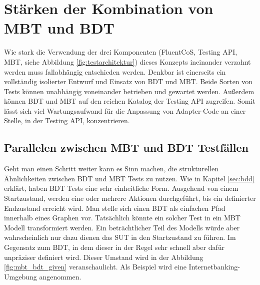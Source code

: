 \section{Stärken der Kombination von MBT und BDT}
\label{sec:mbt_bdt}

Wie stark die Verwendung der drei Komponenten (FluentCoS, Testing API, MBT, siehe Abbildung \ref{fig:testarchitektur}) dieses Konzepts ineinander verzahnt werden muss fallabhängig entschieden werden. Denkbar ist einerseits ein vollständig isolierter Entwurf und Einsatz von \Gls{BDT} und \Gls{MBT}. Beide Sorten von Tests können unabhängig voneinander betrieben und gewartet werden. Außerdem können \Gls{BDT} und \Gls{MBT} auf den reichen Katalog der Testing API zugreifen. Somit lässt sich viel Wartungsaufwand für die Anpassung von Adapter-Code an einer Stelle, in der Testing API, konzentrieren.

\subsection{Parallelen zwischen MBT und BDT Testfällen}
\label{sec:mbt_bdt_parallelen}

Geht man einen Schritt weiter kann es Sinn machen, die strukturellen Ähnlichkeiten zwischen \Gls{BDT} und \Gls{MBT} Tests zu nutzen. Wie in Kapitel \ref{sec:bdd} erklärt, haben \Gls{BDT} Tests eine sehr einheitliche Form. Ausgehend von einem Startzustand, werden eine oder mehrere Aktionen durchgeführt, bis ein definierter Endzustand erreicht wird. Man stelle sich einen \Gls{BDT} als einfachen Pfad innerhalb eines Graphen vor. Tatsächlich könnte ein solcher Test in ein \Gls{MBT} Modell transformiert werden. Ein beträchtlicher Teil des Modells würde aber wahrscheinlich nur dazu dienen das \Gls{SUT} in den Startzustand zu führen. Im Gegensatz zum \Gls{BDT}, in dem dieser in der Regel sehr schnell aber dafür unpräziser definiert wird. Dieser Umstand wird in der Abbildung \ref{fig:mbt_bdt_given} veranschaulicht. Als Beispiel wird eine Internetbanking-Umgebung angenommen.

